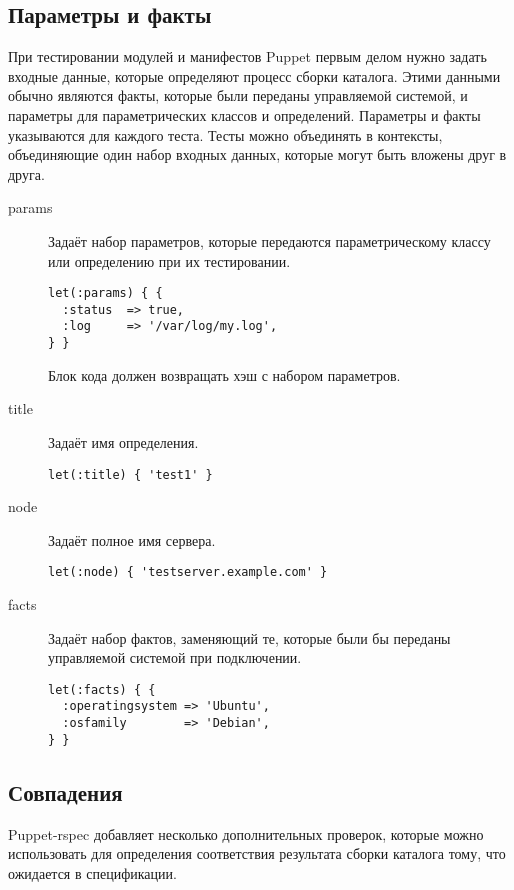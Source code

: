 \subsection{Параметры и факты}

При тестировании модулей и манифестов Puppet первым делом нужно задать входные данные, которые определяют процесс сборки каталога. Этими данными обычно являются факты, которые были переданы управляемой системой, и параметры для параметрических классов и определений. Параметры и факты указываются для каждого теста. Тесты можно объединять в контексты, объединяющие один набор входных данных, которые могут быть вложены друг в друга.

\begin{description}

\item[params]
Задаёт набор параметров, которые передаются параметрическому классу или определению при их тестировании.
\begin{lstlisting}
let(:params) { {
  :status  => true,
  :log     => '/var/log/my.log',
} }
\end{lstlisting}
Блок кода должен возвращать хэш с набором параметров.

\item[title]
Задаёт имя определения.
\begin{lstlisting}
let(:title) { 'test1' }
\end{lstlisting}

\item[node]
Задаёт полное имя сервера.
\begin{lstlisting}
let(:node) { 'testserver.example.com' }
\end{lstlisting}

\item[facts]
Задаёт набор фактов, заменяющий те, которые были бы переданы управляемой системой при подключении.
\begin{lstlisting}
let(:facts) { {
  :operatingsystem => 'Ubuntu',
  :osfamily        => 'Debian',
} }
\end{lstlisting}

\end{description}

\subsection{Совпадения}

Puppet-rspec добавляет несколько дополнительных проверок, которые можно использовать для определения соответствия результата сборки каталога тому, что ожидается в спецификации.

